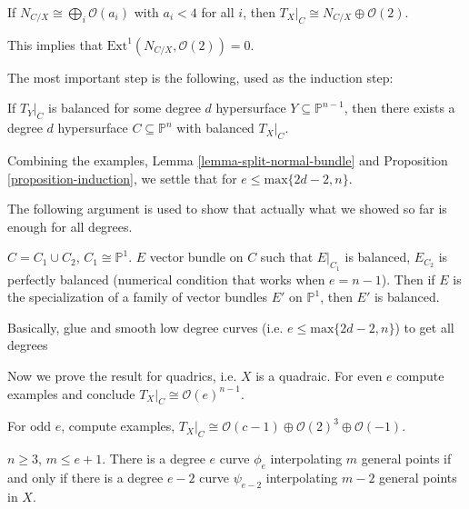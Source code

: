 \begin{theorem}
\begin{theorem}
\begin{lemma}
\label{lemma-split-normal-bundle}
If $N_{C/X}\cong \bigoplus_i \mathcal{O}(a_i)$ 
with $a_i < 4$ for all $i$,
then $T_{X}|_C \cong N_{C/X} \oplus \mathcal{O}(2)$.
\end{lemma}

\noindent
This implies that $\text{Ext}^1(N_{C/X},\mathcal{O}(2))=0$.

The most important step is the following,
used as the induction step:

\begin{proposition}
\label{proposition-induction}
If $T_Y|_C$ is balanced for some degree $d$ 
hypersurface $Y \subseteq \mathbb{P}^{n-1}$,
then there exists a degree $d$ hypersurface
$C \subseteq \mathbb{P}^n$ with balanced
$T_X|_C$.
\end{proposition}

\noindent
Combining the examples, Lemma \ref{lemma-split-normal-bundle}
and Proposition \ref{proposition-induction},
we settle that for $e \leq  \text{max}\{2d-2,n\}$.

The following argument is used to show that 
actually what we showed so far is enough for all degrees.

\begin{lemma}
\label{lemma-smoothing-argument}
$C=C_1 \cup  C_2$, $C_1 \cong \mathbb{P}^1$.
$E$ vector bundle on $C$ such that
$E|_{C_1}$ is balanced,
$E_{C_2}$ is perfectly balanced
(numerical condition that works when $e=n-1$).
Then if $E$ is the specialization of a family
of vector bundles $E'$ on $\mathbb{P}^1$,
then $E'$ is balanced.
\end{lemma}

\noindent
Basically, glue and smooth low degree curves
(i.e. $e \leq  \text{max}\{2d-2,n\}$)
to get all degrees

\noindent

\end{theorem}

\noindent

\end{theorem}

\medskip\noindent
Now we prove the result for quadrics,
i.e. $X$ is a quadraic.
For even $e$ compute examples and conclude
 $T_X|_C \cong \mathcal{O}(e)^{n-1}$.

For odd $e$, compute examples,
$T_X|_C\cong \mathcal{O}(c-1) \oplus \mathcal{O}(2)^{3}\oplus \mathcal{O}(-1)$.

\begin{proposition}
\label{proposition-interpolation2}
$n\geq 3$, $m\leq  e+1$.
There is a degree $e$ curve $\phi_e$ interpolating
$m$ general points if and only if there is a 
degree $e-2$ curve $\psi_{e-2}$ interpolating
$m-2$ general points in $X$.
\end{proposition}

